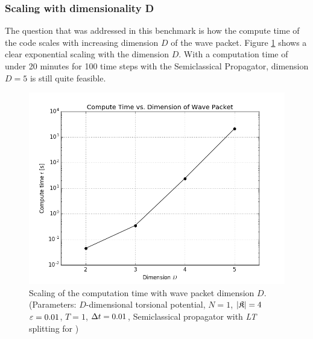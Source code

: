 \subsubsection{Scaling with dimensionality D}
%
The question that was addressed in this benchmark is how the compute time of the code scales with increasing dimension $D$ of the wave packet.
Figure \ref{fig:dimension_analysis} shows a clear exponential scaling with the dimension $D$.
With a computation time of under 20 minutes for 100 time steps with the Semiclassical Propagator, dimension $D=5$ is still quite feasible.
%
\begin{figure}[ht]
	\centering
	\includegraphics[width=.8\textwidth]{figures/dim.png}
	\caption{Scaling of the computation time with wave packet dimension $D$.
	(Parameters: $D$-dimensional torsional potential, $N=1$, $|\mathfrak{K}|=4$ $\varepsilon=0.01$, $T=1$, $\Delta t=0.01$, Semiclassical propagator with \emph{LT} splitting for )}
	\label{fig:dimension_analysis}
\end{figure}
